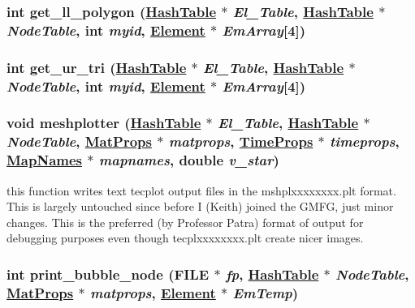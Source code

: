 \hypertarget{tecplot_8C_a5}{
\subsubsection[get\_\-ll\_\-polygon]{\setlength{\rightskip}{0pt plus 5cm}int get\_\-ll\_\-polygon (\hyperlink{classHashTable}{Hash\-Table} $\ast$ {\em El\_\-Table}, \hyperlink{classHashTable}{Hash\-Table} $\ast$ {\em Node\-Table}, int {\em myid}, \hyperlink{classElement}{Element} $\ast$ {\em Em\-Array}\mbox{[}4\mbox{]})}}
\label{tecplot_8C_a5}


\hypertarget{tecplot_8C_a6}{
\subsubsection[get\_\-ur\_\-tri]{\setlength{\rightskip}{0pt plus 5cm}int get\_\-ur\_\-tri (\hyperlink{classHashTable}{Hash\-Table} $\ast$ {\em El\_\-Table}, \hyperlink{classHashTable}{Hash\-Table} $\ast$ {\em Node\-Table}, int {\em myid}, \hyperlink{classElement}{Element} $\ast$ {\em Em\-Array}\mbox{[}4\mbox{]})}}
\label{tecplot_8C_a6}


\hypertarget{tecplot_8C_a13}{
\subsubsection[meshplotter]{\setlength{\rightskip}{0pt plus 5cm}void meshplotter (\hyperlink{classHashTable}{Hash\-Table} $\ast$ {\em El\_\-Table}, \hyperlink{classHashTable}{Hash\-Table} $\ast$ {\em Node\-Table}, \hyperlink{structMatProps}{Mat\-Props} $\ast$ {\em matprops}, \hyperlink{structTimeProps}{Time\-Props} $\ast$ {\em timeprops}, \hyperlink{structMapNames}{Map\-Names} $\ast$ {\em mapnames}, double {\em v\_\-star})}}
\label{tecplot_8C_a13}


this function writes text tecplot output files in the mshplxxxxxxxx.plt format. This is largely untouched since before I (Keith) joined the GMFG, just minor changes. This is the preferred (by Professor Patra) format of output for debugging purposes even though tecplxxxxxxxx.plt create nicer images. 

\hypertarget{tecplot_8C_a7}{
\subsubsection[print\_\-bubble\_\-node]{\setlength{\rightskip}{0pt plus 5cm}int print\_\-bubble\_\-node (FILE $\ast$ {\em fp}, \hyperlink{classHashTable}{Hash\-Table} $\ast$ {\em Node\-Table}, \hyperlink{structMatProps}{Mat\-Props} $\ast$ {\em matprops}, \hyperlink{classElement}{Element} $\ast$ {\em Em\-Temp})}}
\label{tecplot_8C_a7}


